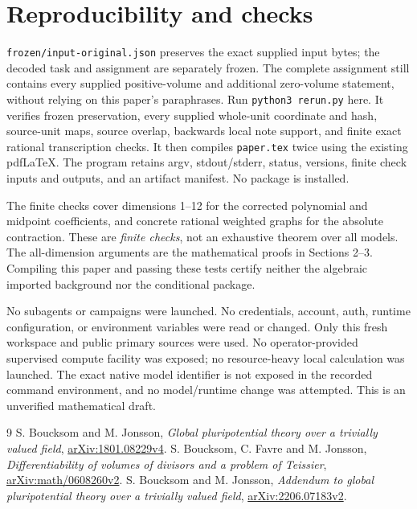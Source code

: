 \documentclass[10pt]{article}
\begin{document}
\section{Reproducibility and checks}
\texttt{frozen/input-original.json} preserves the exact supplied input bytes;
the decoded task and assignment are separately frozen. The complete assignment
still contains every supplied positive-volume and additional zero-volume
statement, without relying on this paper's paraphrases. Run
\texttt{python3 rerun.py} here. It verifies frozen preservation, every
supplied whole-unit coordinate and hash, source-unit maps, source overlap,
backwards local note support, and finite exact rational transcription checks.
It then compiles \texttt{paper.tex} twice using the existing pdfLaTeX.
The program retains argv, stdout/stderr, status, versions, finite check inputs
and outputs, and an artifact manifest. No package is installed.

The finite checks cover dimensions 1--12 for the corrected polynomial and
midpoint coefficients, and concrete rational weighted graphs for the absolute
contraction. These are \emph{finite checks}, not an exhaustive theorem over
all models. The all-dimension arguments are the mathematical proofs in
Sections 2--3. Compiling this paper and passing these tests certify neither
the algebraic imported background nor the conditional package.

No subagents or campaigns were launched. No credentials, account, auth,
runtime configuration, or environment variables were read or changed.
Only this fresh workspace and public primary sources were used.
No operator-provided supervised compute facility was exposed; no
resource-heavy local calculation was launched. The exact native model
identifier is not exposed in the recorded command environment, and no
model/runtime change was attempted. This is an unverified mathematical draft.

\begin{thebibliography}{9}
 S. Boucksom and M. Jonsson,
\emph{Global pluripotential theory over a trivially valued field},
\href{https://arxiv.org/pdf/1801.08229v4}{arXiv:1801.08229v4}.
 S. Boucksom, C. Favre and M. Jonsson,
\emph{Differentiability of volumes of divisors and a problem of Teissier},
\href{https://arxiv.org/html/math/0608260v2}{arXiv:math/0608260v2}.
 S. Boucksom and M. Jonsson,
\emph{Addendum to global pluripotential theory over a trivially valued field},
\href{https://arxiv.org/pdf/2206.07183v2}{arXiv:2206.07183v2}.
\end{thebibliography}
\end{document}
